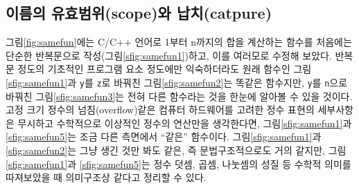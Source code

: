 \subsection{이름의 유효범위(scope)와 납치(catpure)}
그림\;\ref{fig:samefun}에는 C/C++ 언어로 1부터 n까지의 합을 계산하는 함수를
처음에는 단순한 반복문으로 작성(그림\;\ref{sfig:samefun1})하고, 이를 여러모로
수정해 보았다. 반복문 정도의 기초적인 프로그램 요소 정도에만 익숙하더라도
원래 함수인 그림\;\ref{sfig:samefun1}과 \texttt{y}를 \texttt{z}로 바꿔친
그림\;\ref{sfig:samefun2}는 똑같은 함수지만, \texttt{y}를 \texttt{n}으로
바꿔친 그림\;\ref{sfig:samefun3}는 전혀 다른 함수라는 것을 한눈에 알아볼 수
있을 것이다. 고정 크기 정수의 넘침(overflow)같은 컴퓨터 하드웨어를 고려한 
정수 표현의 세부사항은 무시하고 수학적으로 이상적인 정수의 연산만을 생각한다면,
그림\;\ref{sfig:samefun1}과 \ref{sfig:samefun5}는 조금 다른 측면에서
``같은'' 함수이다. 그림\;\ref{sfig:samefun1}과 \ref{sfig:samefun2}는
그냥 생긴 것만 봐도 같은, 즉 문법구조적으로도 거의 같지만,
그림\;\ref{sfig:samefun1}과 \ref{sfig:samefun5}는 정수 덧셈, 곱셈, 나눗셈의
성질 등 수학적 의미를 따져보았을 때 의미구조상 같다고 정리할 수 있다.

